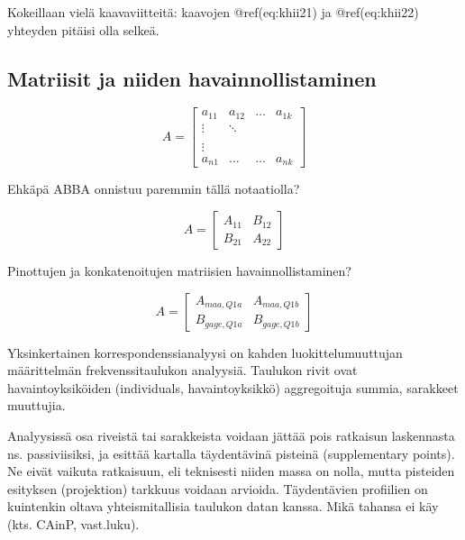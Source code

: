 \documentclass[
  finnish,
]{book}
\begin{document}
Kokeillaan vielä kaavaviitteitä: kaavojen @ref(eq:khii21) ja
@ref(eq:khii22) yhteyden pitäisi olla selkeä.

\hypertarget{matriisit-ja-niiden-havainnollistaminen}{%
\subsection{Matriisit ja niiden
havainnollistaminen}\label{matriisit-ja-niiden-havainnollistaminen}}

\begin{equation}
A = \begin{bmatrix}
    a_{11} & a_{12} & \dots & a_{1k}\\
    \vdots & \ddots & \\
    \\
    \vdots \\
    a_{n1} & \dots  & \dots & a_{nk}
    \end{bmatrix}
\end{equation}

Ehkäpä ABBA onnistuu paremmin tällä notaatiolla?

\begin{equation}
A = \begin{bmatrix}
    A_{11} & B_{12}  \\
    B_{21} & A_{22}
    \end{bmatrix}
\end{equation}

Pinottujen ja konkatenoitujen matriisien havainnollistaminen?

\begin{equation}
A = \begin{bmatrix}
    A_{maa, Q1a} & A_{maa, Q1b}  \\
    B_{gage, Q1a} & B_{gage, Q1b}
    \end{bmatrix}
\end{equation}

Yksinkertainen korrespondenssianalyysi on kahden luokittelumuuttujan
määrittelmän frekvenssitaulukon analyysiä. Taulukon rivit ovat
havaintoyksiköiden (individuals, havaintoyksikkö) aggregoituja summia,
sarakkeet muuttujia.

Analyysissä osa riveistä tai sarakkeista voidaan jättää pois ratkaisun
laskennasta ns. passiviisiksi, ja esittää kartalla täydentävinä pisteinä
(supplementary points). Ne eivät vaikuta ratkaisuun, eli teknisesti
niiden massa on nolla, mutta pisteiden esityksen (projektion) tarkkuus
voidaan arvioida. Täydentävien profiilien on kuintenkin oltava
yhteismitallisia taulukon datan kanssa. Mikä tahansa ei käy (kts. CAinP,
vast.luku).
\end{document}
